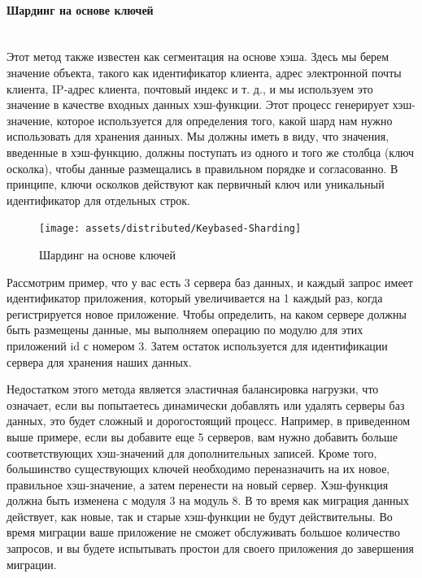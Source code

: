 \paragraph{Шардинг на основе ключей} ~\\
Этот метод также известен как сегментация на основе хэша. Здесь мы берем значение объекта, такого как идентификатор
клиента, адрес электронной почты клиента, IP-адрес клиента, почтовый индекс и т. д., и мы используем это значение в
качестве входных данных хэш-функции. Этот процесс генерирует хэш-значение, которое используется для определения того,
какой шард нам нужно использовать для хранения данных. Мы должны иметь в виду, что значения, введенные в хэш-функцию,
должны поступать из одного и того же столбца (ключ осколка), чтобы данные размещались в правильном порядке и
согласованно. В принципе, ключи осколков действуют как первичный ключ или уникальный идентификатор для отдельных строк.

\begin{figure}[H]
    \centering
    \texttt{[image: assets/distributed/Keybased-Sharding]}
    \caption{Шардинг на основе ключей}
    \label{fig:Keybased-Sharding}
\end{figure}

Рассмотрим пример, что у вас есть 3 сервера баз данных, и каждый запрос имеет идентификатор приложения, который
увеличивается на 1 каждый раз, когда регистрируется новое приложение. Чтобы определить, на каком сервере должны быть
размещены данные, мы выполняем операцию по модулю для этих приложений id с номером 3. Затем остаток используется для
идентификации сервера для хранения наших данных.

Недостатком этого метода является эластичная балансировка нагрузки, что означает, если вы попытаетесь динамически
добавлять или удалять серверы баз данных, это будет сложный и дорогостоящий процесс. Например, в приведенном выше
примере, если вы добавите еще 5 серверов, вам нужно добавить больше соответствующих хэш-значений для дополнительных
записей. Кроме того, большинство существующих ключей необходимо переназначить на их новое, правильное хэш-значение,
а затем перенести на новый сервер. Хэш-функция должна быть изменена с модуля 3 на модуль 8. В то время как миграция
данных действует, как новые, так и старые хэш-функции не будут действительны. Во время миграции ваше приложение не
сможет обслуживать большое количество запросов, и вы будете испытывать простои для своего приложения до завершения
миграции. \autocite{DatabaseSharding}

